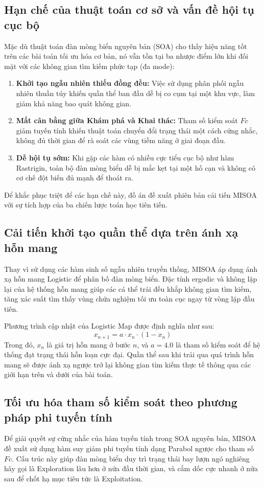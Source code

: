 \documentclass[12pt, a4paper]{article}
\begin{document}
\subsection{Hạn chế của thuật toán cơ sở và vấn đề hội tụ cục bộ}
Mặc dù thuật toán đàn mòng biển nguyên bản (SOA) cho thấy hiệu năng tốt trên các bài toán tối ưu hóa cơ bản, nó vẫn tồn tại ba nhược điểm lớn khi đối mặt với các không gian tìm kiếm phức tạp (đa mode):
\begin{enumerate}
    \item \textbf{Khởi tạo ngẫu nhiên thiếu đồng đều:} Việc sử dụng phân phối ngẫu nhiên thuần túy khiến quần thể ban đầu dễ bị co cụm tại một khu vực, làm giảm khả năng bao quát không gian.
    \item \textbf{Mất cân bằng giữa Khám phá và Khai thác:} Tham số kiểm soát $Fc$ giảm tuyến tính khiến thuật toán chuyển đổi trạng thái một cách cứng nhắc, không đủ thời gian để rà soát các vùng tiềm năng ở giai đoạn đầu.
    \item \textbf{Dễ hội tụ sớm:} Khi gặp các hàm có nhiều cực tiểu cục bộ như hàm Rastrigin, toàn bộ đàn mòng biển dễ bị mắc kẹt tại một hố cạn và không có cơ chế đột biến đủ mạnh để thoát ra.
\end{enumerate}
Để khắc phục triệt để các hạn chế này, đồ án đề xuất phiên bản cải tiến MISOA với sự tích hợp của ba chiến lược toán học tiên tiến.

\subsection{Cải tiến khởi tạo quần thể dựa trên ánh xạ hỗn mang}
Thay vì sử dụng các hàm sinh số ngẫu nhiên truyền thống, MISOA áp dụng ánh xạ hỗn mang \cite{chaotic_maps} Logistic để phân bố đàn mòng biển. Đặc tính ergodic và không lặp lại của hệ thống hỗn mang giúp các cá thể trải đều khắp không gian tìm kiếm, tăng xác suất tìm thấy vùng chứa nghiệm tối ưu toàn cục ngay từ vòng lặp đầu tiên.

Phương trình cập nhật của Logistic Map được định nghĩa như sau:
\begin{equation}
x_{n+1} = a \cdot x_n \cdot (1 - x_n)
\end{equation}
Trong đó, $x_n$ là giá trị hỗn mang ở bước $n$, và $a = 4.0$ là tham số kiểm soát để hệ thống đạt trạng thái hỗn loạn cực đại. Quần thể sau khi trải qua quá trình hỗn mang sẽ được ánh xạ ngược trở lại không gian tìm kiếm thực tế thông qua các giới hạn trên và dưới của bài toán.

\subsection{Tối ưu hóa tham số kiểm soát theo phương pháp phi tuyến tính}
Để giải quyết sự cứng nhắc của hàm tuyến tính trong SOA nguyên bản, MISOA đề xuất sử dụng hàm suy giảm phi tuyến tính dạng Parabol ngược cho tham số $Fc$. Cấu trúc này giúp đàn mòng biển duy trì trạng thái bay lượn ngó nghiêng hây gọi là Exploration lâu hơn ở nửa đầu thời gian, và cắm dốc cực nhanh ở nửa sau để chốt hạ mục tiêu tức là Exploitation.
\end{document}
